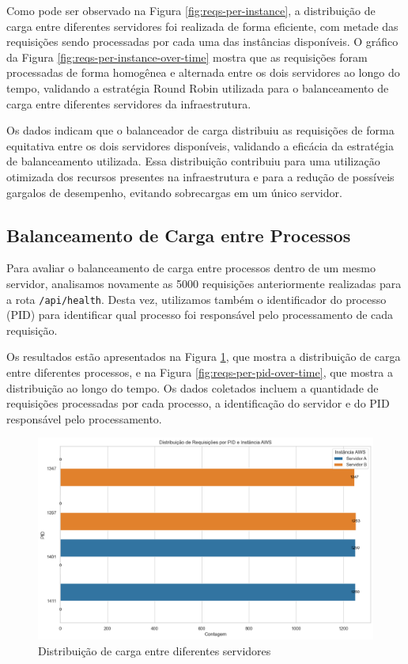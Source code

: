 Como pode ser observado na Figura \ref{fig:reqs-per-instance}, a distribuição de carga entre diferentes servidores foi realizada de forma eficiente, com metade das requisições sendo processadas por cada uma das instâncias disponíveis. O gráfico da Figura \ref{fig:reqs-per-instance-over-time} mostra que as requisições foram processadas de forma homogênea e alternada entre os dois servidores ao longo do tempo, validando a estratégia Round Robin utilizada para o balanceamento de carga entre diferentes servidores da infraestrutura.

Os dados indicam que o balanceador de carga distribuiu as requisições de forma equitativa entre os dois servidores disponíveis, validando a eficácia da estratégia de balanceamento utilizada. Essa distribuição contribuiu para uma utilização otimizada dos recursos presentes na infraestrutura e para a redução de possíveis gargalos de desempenho, evitando sobrecargas em um único servidor.

\subsection{Balanceamento de Carga entre Processos}

Para avaliar o balanceamento de carga entre processos dentro de um mesmo servidor, analisamos novamente as 5000 requisições anteriormente realizadas para a rota \texttt{/api/health}. Desta vez, utilizamos também o identificador do processo (PID) para identificar qual processo foi responsável pelo processamento de cada requisição.

Os resultados estão apresentados na Figura \ref{fig:reqs-per-pid}, que mostra a distribuição de carga entre diferentes processos, e na Figura \ref{fig:reqs-per-pid-over-time}, que mostra a distribuição ao longo do tempo. Os dados coletados incluem a quantidade de requisições processadas por cada processo, a identificação do servidor e do PID responsável pelo processamento.


\begin{figure}[H]
    \centering
    \includegraphics[width=1\textwidth]{assets/balance-test/reqs-per-pid.png}
    \caption{Distribuição de carga entre diferentes servidores}
    \label{fig:reqs-per-pid}
\end{figure}

